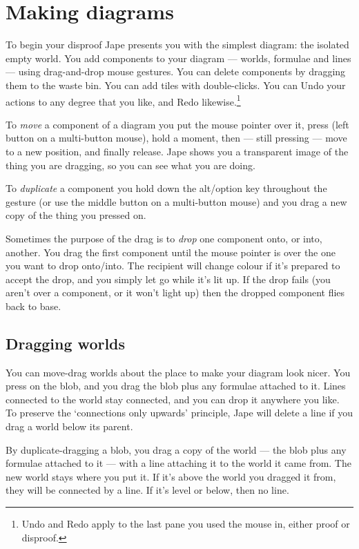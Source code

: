 \documentclass[11pt]{book}
\begin{document}
\section{Making diagrams}

To begin your disproof Jape presents you with the simplest diagram: the isolated empty world. You add components to your diagram --- worlds, formulae and lines --- using drag-and-drop mouse gestures. You can delete components by dragging them to the waste bin. You can add tiles with double-clicks. You can Undo your actions to any degree that you like, and Redo likewise.\footnote{Undo and Redo apply to the last pane you used the mouse in, either proof or disproof.} 

To \emph{move} a component of a diagram you put the mouse pointer over it, press (left button on a multi-button mouse), hold a moment, then --- still pressing --- move to a new position, and finally release. Jape shows you a transparent image of the thing you are dragging, so you can see what you are doing.

To \emph{duplicate} a component you hold down the alt/option key throughout the gesture (or use the middle button on a multi-button mouse) and you drag a new copy of the thing you pressed on.

Sometimes the purpose of the drag is to \emph{drop} one component onto, or into, another. You drag the first component until the mouse pointer is over the one you want to drop onto/into. The recipient will change colour if it's prepared to accept the drop, and you simply let go while it's lit up. If the drop fails (you aren't over a component, or it won't light up) then the dropped component flies back to base.

\subsection{Dragging worlds}

You can move-drag worlds about the place to make your diagram look nicer. You press on the blob, and you drag the blob plus any formulae attached to it. Lines connected to the world stay connected, and you can drop it anywhere you like. To preserve the `connections only upwards' principle, Jape will delete a line if you drag a world below its parent.

By duplicate-dragging a blob, you drag a copy of the world --- the blob plus any formulae attached to it --- with a line attaching it to the world it came from. The new world stays where you put it. If it's above the world you dragged it from, they will be connected by a line. If it's level or below, then no line.
\end{document}
